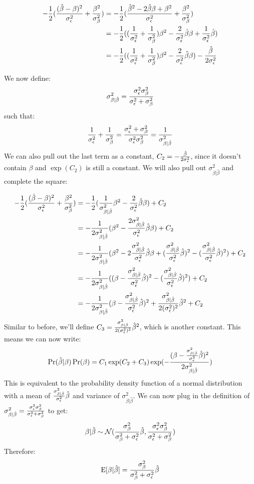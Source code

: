 \documentclass[12pt]{article}
\newcommand{\varbb}{\sigma_{\beta | \hat{\beta}}^2} %
\begin{document}
\begin{align*}
-\frac{1}{2} (\frac{(\hat{\beta} - \beta)^2}{\sigma_{\epsilon}^2} + \frac{\beta^2}{\sigma_{\beta}^2}) &= 
-\frac{1}{2} (\frac{\hat{\beta}^2 - 2 \hat{\beta} \beta + \beta^2}{\sigma_{\epsilon}^2} + \frac{\beta^2}{\sigma_{\beta}^2}) \\
&= -\frac{1}{2} ((\frac{1}{\sigma_{\epsilon}^2}+\frac{1}{\sigma_{\beta}^2})\beta^2 - \frac{2}{\sigma_{\epsilon}^2} \hat{\beta} \beta + \frac{1}{\sigma_{\epsilon}^2} \hat{\beta}) \\
&= -\frac{1}{2} ((\frac{1}{\sigma_{\epsilon}^2}+\frac{1}{\sigma_{\beta}^2})\beta^2 - \frac{2}{\sigma_{\epsilon}^2} \hat{\beta} \beta) - \frac{\hat{\beta}}{2 \sigma_{\epsilon}^2}
\end{align*}

We now define:
$$\varbb = \frac{\vareps \varbeta}{\vareps + \varbeta}$$
such that:
$$
\frac{1}{\vareps}+\frac{1}{\varbeta} = \frac{\vareps + \varbeta}{\vareps \varbeta} = \frac{1}{\varbb} $$
We can also pull out the last term as a constant, $C_2 = - \frac{\hat{\beta}}{2 \sigma_{\epsilon}^2}$, since it doesn't contain $\beta$ and $\exp(C_2)$ is still a constant.
We will also pull out $\varbb$ and complete the square:

\begin{align*}
    -\frac{1}{2} (\frac{(\hat{\beta} - \beta)^2}{\vareps} + \frac{\beta^2}{\varbeta})
    &= -\frac{1}{2} (\frac{1}{\varbb} \beta^2 - \frac{2}{\vareps} \hat{\beta} \beta) + C_2 \\
    &= -\frac{1}{2 \varbb} (\beta^2 - \frac{2 \varbb}{\vareps} \hat{\beta} \beta) + C_2 \\
    &= -\frac{1}{2 \varbb} (\beta^2 - 2 \frac{\varbb}{\vareps} \hat{\beta} \beta + (\frac{\varbb}{\vareps} \hat{\beta})^2 - (\frac{\varbb}{\vareps} \hat{\beta})^2) + C_2 \\
    &= -\frac{1}{2 \varbb} ((\beta - \frac{\varbb}{\vareps} \hat{\beta})^2 - (\frac{\varbb}{\vareps} \hat{\beta})^2) + C_2 \\
    &= -\frac{1}{2 \varbb} (\beta - \frac{\varbb}{\vareps} \hat{\beta})^2 + \frac{\varbb}{2 (\vareps)^2} \hat{\beta}^2 + C_2
\end{align*}
Similar to before, we'll define $C_3 = \frac{\varbb}{2 (\vareps)^2} \hat{\beta}^2$, which is another constant. This means we can now write:
$$ \Pr(\hat{\beta} | \beta) \Pr(\beta) = 
C_1 \exp(C_2 + C_3) \exp(
    -\frac{(\beta - \frac{\varbb}{\vareps} \hat{\beta})^2}{2 \varbb} ) $$
This is equivalent to the probability density function of a normal distribution with a mean of $\frac{\varbb}{\vareps} \hat{\beta}$ and variance of $\varbb$.
We can now plug in the definition of $\varbb = \frac{\vareps \varbeta}{\vareps + \varbeta}$ to get:
$$
\beta | \hat{\beta} \sim \mathcal{N}(\frac{\sigma_{\beta}^2}{\sigma_{\beta}^2 + \sigma_{\epsilon}^2}\hat{\beta}, \frac{\sigma_{\epsilon}^2 \sigma_{\beta}^2}{\sigma_{\epsilon}^2 + \sigma_{\beta}^2})
$$
Therefore:
$$ \mathrm{E}[\beta | \hat{\beta}] = \frac{\sigma_{\beta}^2}{\sigma_{\beta}^2 + \sigma_{\epsilon}^2}\hat{\beta} $$
\end{document}
